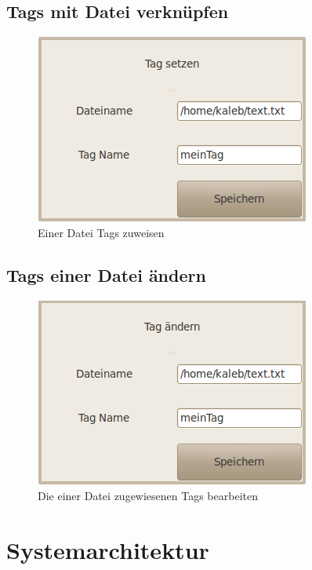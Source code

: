 \documentclass[10pt,paper=a4,final]{scrartcl}
\begin{document}
\subsection{Tags mit Datei verkn\"upfen}
\begin{figure}[h!]
    \includegraphics[scale=0.6]{vk1.png}
   \caption{Einer Datei Tags zuweisen}
\end{figure}
\subsection{Tags einer Datei \"andern}
\begin{figure}[h!]
    \includegraphics[scale=0.6]{vk2.png}
   \caption{Die einer Datei zugewiesenen Tags bearbeiten}
\end{figure}
\newpage
\section{Systemarchitektur}
\end{document}
